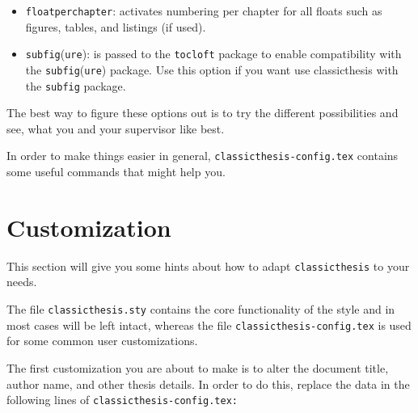 \begin{itemize}
\begin{itemize}
        \item\texttt{floatperchapter}: activates numbering per chapter for
        all floats such as figures, tables, and listings (if used).
        
        \item\texttt{subfig}(\texttt{ure}): is passed to the \texttt{tocloft}
        package to enable compatibility with the \texttt{subfig}(\texttt{ure})
        package. Use this option if you want use classicthesis with the
        \texttt{subfig} package.
        
        \end{itemize}
    
\end{itemize}
The best way to figure these options out is to try the different
possibilities and see, what you and your supervisor like best.

In order to make things easier in general,
\texttt{classicthesis-config.tex}
contains some useful commands that might help you.


\section{Customization}\label{sec:custom}
This section will give you some hints about how to adapt
\texttt{classicthesis} to your needs.

The file \texttt{classicthesis.sty}
contains the core functionality of the style and in most cases will
be left intact, whereas the file \texttt{classic\-thesis-config.tex}
is used for some common user customizations.

The first customization you are about to make is to alter the document
title, author name, and other thesis details. In order to do this, replace
the data in the following lines of \texttt{classicthesis-config.tex:}%

